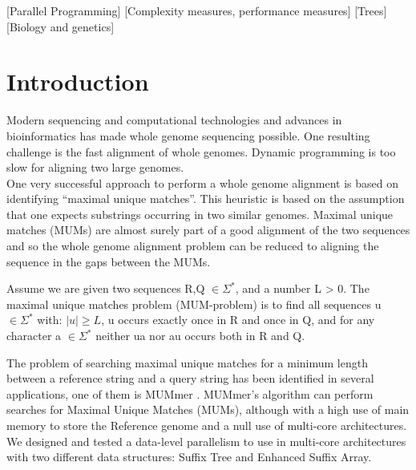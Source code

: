 \documentclass{acm_proc_article-sp}
\begin{document}
[Parallel Programming]
[Complexity measures, performance measures]
[Trees]
[Biology and genetics]



\section{Introduction} 
Modern sequencing and computational technologies and advances in bioinformatics has made whole genome sequencing possible. One resulting challenge is the fast alignment of whole genomes. Dynamic programming is too slow for aligning two large genomes.\\
One very successful approach to perform a whole genome alignment is based on identifying ``maximal unique matches''. This heuristic is based on the assumption that one expects substrings occurring in two similar genomes. Maximal unique matches (MUMs) are almost surely part of a good alignment of the two sequences and so the whole genome alignment problem can be reduced to aligning the sequence in the gaps between the MUMs.
\begin{definition}
Assume we are given two sequences R,Q $\in \Sigma^*$, and a number L > 0. The maximal unique matches problem (MUM-problem) is to find all sequences u $\in \Sigma^*$ with: $|u|\geq L$, u occurs exactly once in R and once in Q, and for any character a $\in \Sigma^*$ neither ua nor au occurs both in R and Q.
\end{definition}
The problem of searching maximal unique matches for a minimum length between a reference string and a query string has been identified in several applications, one of them is MUMmer \cite{Delcher2003}. MUMmer's algorithm can perform searches for Maximal Unique Matches (MUMs), although with a high use of main memory to store the Reference genome and a null use of multi-core architectures.\\
We designed and tested a data-level parallelism to use in multi-core architectures with two different data structures: Suffix Tree and Enhanced Suffix Array.
\end{document}
